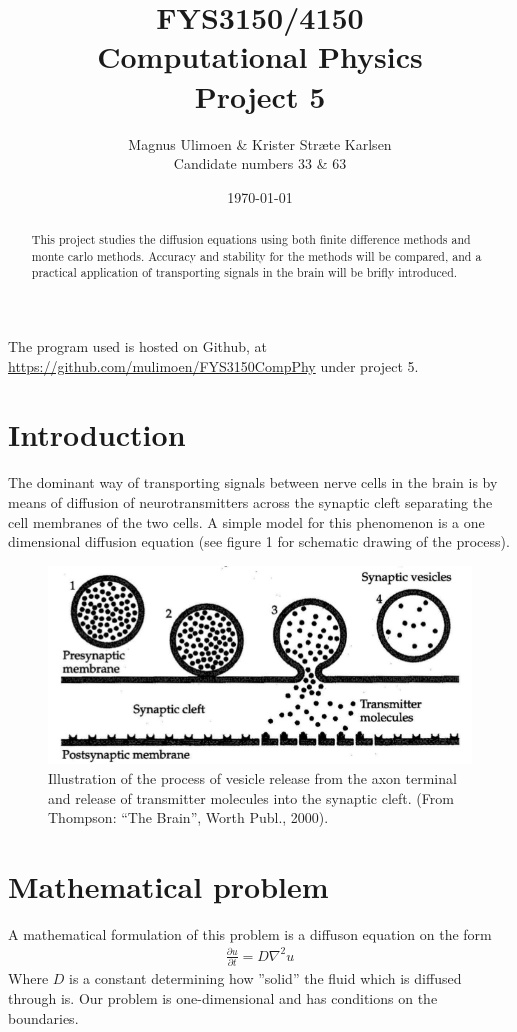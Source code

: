 \documentclass[11pt,a4paper,draft]{article}
\title{FYS3150/4150\\Computational Physics\\Project 5}
\author{Magnus Ulimoen \& Krister Stræte Karlsen\\
Candidate numbers 33 \& 63}
\date{\today}
\numberwithin{equation}{section}
\begin{document}
\maketitle

\begin{abstract}
This project studies the diffusion equations using both finite difference methods and monte carlo methods. Accuracy and stability for the methods will be compared, and a practical application of transporting signals in the brain will be brifly introduced. 
\end{abstract}

The program used is hosted on Github, at 
\url{https://github.com/mulimoen/FYS3150CompPhy} under project 5.

\section{Introduction}
The dominant way of transporting signals between nerve cells in the brain is by means of diffusion of neurotransmitters across the synaptic cleft separating the cell membranes of the two cells. A simple model for this phenomenon is a one dimensional diffusion equation (see figure 1 for schematic drawing of the process). 

\begin{figure}[H]
\centering
\includegraphics[scale=0.15]{fig1.png}
\caption{Illustration of the process of vesicle release from the axon terminal and release of transmitter molecules into the synaptic cleft. (From Thompson: “The Brain”, Worth Publ., 2000).}
\label{fig:spin_neighbours_full}
\end{figure}

\section{Mathematical problem}
A mathematical formulation of this problem is a diffuson equation on the form
\begin{gather}
\frac{\partial u}{\partial t} = D\nabla^2u
\end{gather}
Where $D$ is a constant determining how ''solid'' the fluid which is 
diffused through is. Our problem is one-dimensional and has conditions on 
the boundaries.
\end{document}
